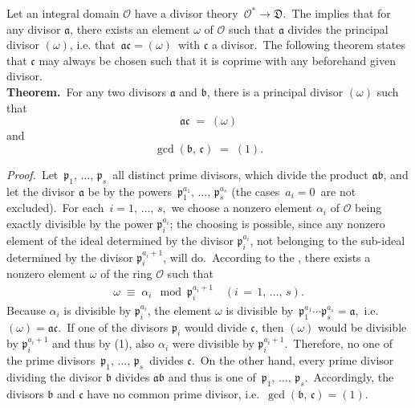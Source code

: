 \documentclass[12pt]{article}
\theoremstyle{definition}
\begin{document}
Let an integral domain $\mathcal{O}$ have a divisor theory \,$\mathcal{O}^* \to \mathfrak{D}$.\, The  implies that for any divisor $\mathfrak{a}$, there exists an element $\omega$ of $\mathcal{O}$ such that $\mathfrak{a}$ divides the principal divisor $(\omega)$, i.e. that\, $\mathfrak{ac} = (\omega)$\, with $\mathfrak{c}$ a divisor.\, The following theorem states that $\mathfrak{c}$ may always be chosen such that it is coprime with any beforehand given divisor.\\

\textbf{Theorem.}\, For any two divisors $\mathfrak{a}$ and $\mathfrak{b}$, there is a principal divisor $(\omega)$ such that
$$\mathfrak{ac} \;=\; (\omega)$$
and
$$\gcd(\mathfrak{b},\,\mathfrak{c}) \;=\; (1).$$


{\em Proof.}\, Let\, $\mathfrak{p}_1,\,\ldots,\,\mathfrak{p}_s$\, all distinct prime divisors, which divide the product $\mathfrak{ab}$, and let the divisor $\mathfrak{a}$ be  by the powers\, $\mathfrak{p}_1^{a_1},\,\ldots,\,\mathfrak{p}_s^{a_s}$ (the cases\, $a_i = 0$\, are not excluded).\, For each\, $i = 1,\,\ldots,\,s$,\, we choose a nonzero element $\alpha_i$ of $\mathcal{O}$ being exactly divisible by the power $\mathfrak{p}_i^{a_i}$; the choosing is possible, since any nonzero element of the ideal determined by the divisor $\mathfrak{p}_i^{a_i}$, not belonging to the sub-ideal determined by the divisor $\mathfrak{p}_i^{a_i+1}$, will do.\, According to the , there exists a nonzero element $\omega$ of the ring $\mathcal{O}$ such that
\begin{align}
\omega \;\equiv\; \alpha_i \mod{\mathfrak{p}_i^{a_i+1}} \quad (i \,=\, 1,\,\ldots,\,s).
\end{align}
Because $\alpha_i$ is divisible by $\mathfrak{p}_i^{a_i}$, the element $\omega$ is divisible by\, $\mathfrak{p}_1^{a_1}\cdots\mathfrak{p}_s^{a_s} = \mathfrak{a}$,\, i.e.\, $(\omega) = \mathfrak{ac}$.\, If one of the divisors $\mathfrak{p}_i$ would divide $\mathfrak{c}$, then $(\omega)$ would be divisible by $\mathfrak{p}_i^{a_i+1}$ and thus by (1), also $\alpha_i$ were divisible by $\mathfrak{p}_i^{a_i+1}$.\, Therefore, no one of the prime divisors\, $\mathfrak{p}_1,\,\ldots,\,\mathfrak{p}_s$\, divides $\mathfrak{c}$.\, On the other hand, every prime divisor dividing the divisor $\mathfrak{b}$ divides $\mathfrak{ab}$ and thus is one of\, $\mathfrak{p}_1,\,\ldots,\,\mathfrak{p}_s$.\, Accordingly, the divisors $\mathfrak{b}$ and $\mathfrak{c}$ have no common prime divisor, i.e.\, $\gcd(\mathfrak{b},\,\mathfrak{c}) = (1)$.
\end{document}
